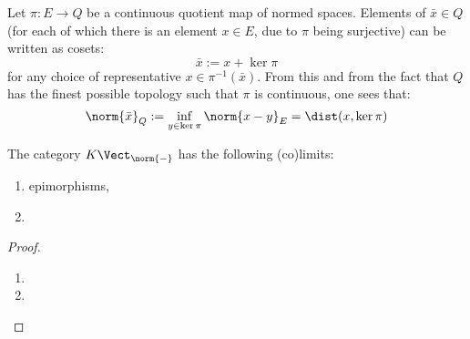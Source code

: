         \begin{remark} \label{remark: quotient_norms}
            Let $\pi: E \to Q$ be a continuous quotient map of normed spaces. Elements of $\bar{x} \in Q$ (for each of which there is an element $x \in E$, due to $\pi$ being surjective) can be written as cosets:
                $$\bar{x} := x + \ker \pi$$
            for any choice of representative $x \in \pi^{-1}(\bar{x})$. From this and from the fact that $Q$ has the finest possible topology such that $\pi$ is continuous, one sees that:
                $$\norm{\bar{x}}_Q := \inf_{y \in \ker \pi} \norm{x - y}_E = \dist(x, \ker \pi)$$
        \end{remark}
        \begin{lemma}
            The category $K\-\Vect_{\norm{-}}$ has the following (co)limits:
            \begin{enumerate}
                \item epimorphisms,
                \item 
            \end{enumerate}
        \end{lemma}
            \begin{proof}
                \begin{enumerate}
                    \item 
                    \item 
                \end{enumerate}
            \end{proof}

